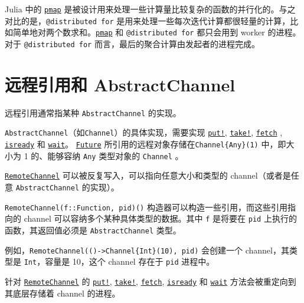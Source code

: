 Julia 中的 \hyperlink{9432281416771383761}{\texttt{pmap}} 是被设计用来处理一些计算量比较复杂的函数的并行化的。与之对比的是，\texttt{@distributed for} 是用来处理一些每次迭代计算都很轻量的计算，比如简单地对两个数求和。\hyperlink{9432281416771383761}{\texttt{pmap}} 和 \texttt{@distributed for} 都只会用到 worker 的进程。对于 \texttt{@distributed for} 而言，最后的聚合计算由发起者的进程完成。



\hypertarget{14860671192412743510}{}


\section{远程引用和 AbstractChannel}



远程引用通常指某种 \texttt{AbstractChannel} 的实现。



\texttt{AbstractChannel}（如\texttt{Channel}）的具体实现，需要实现 \hyperlink{10812715779190652189}{\texttt{put!}}, \hyperlink{4963355246106153560}{\texttt{take!}}, \hyperlink{11007884648860062495}{\texttt{fetch}} , \hyperlink{15888554370655089980}{\texttt{isready}} 和 \hyperlink{13761789780433862250}{\texttt{wait}}。 \hyperlink{4170271048165085864}{\texttt{Future}} 所引用的远程对象存储在\texttt{Channel\{Any\}(1)} 中，即大小为 1 的、能够容纳 \texttt{Any} 类型对象的 \texttt{Channel} 。



\hyperlink{16773267780467157552}{\texttt{RemoteChannel}} 可以被反复写入，可以指向任意大小和类型的 channel（或者是任意 \texttt{AbstractChannel} 的实现）。



\texttt{RemoteChannel(f::Function, pid)()} 构造器可以构造一些引用，而这些引用指向的 channel 可以容纳多个某种具体类型的数据。其中 \texttt{f} 是将要在 \texttt{pid} 上执行的函数，其返回值必须是 \texttt{AbstractChannel} 类型。



例如，\texttt{RemoteChannel(()->Channel\{Int\}(10), pid)} 会创建一个 channel，其类型是 \texttt{Int}，容量是 10，这个 channel 存在于 \texttt{pid} 进程中。



针对 \hyperlink{16773267780467157552}{\texttt{RemoteChannel}} 的 \hyperlink{10812715779190652189}{\texttt{put!}}, \hyperlink{4963355246106153560}{\texttt{take!}}, \hyperlink{11007884648860062495}{\texttt{fetch}}, \hyperlink{15888554370655089980}{\texttt{isready}} 和 \hyperlink{13761789780433862250}{\texttt{wait}} 方法会被重定向到其底层存储着 channel 的进程。



